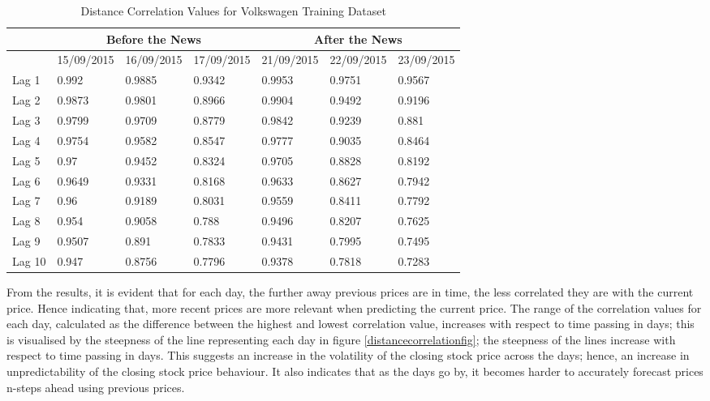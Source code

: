 \documentclass[13pt]{report}
\begin{document}
 
\begin{table}[H]
\centering
\label{distancecorrelationtab}
\begin{tabular}{|l|l|l|l|l|l|l|}
\hline
       & \multicolumn{3}{c|}{Before the News} & \multicolumn{3}{c|}{After the News}  \\ \hline
       & 15/09/2015 & 16/09/2015 & 17/09/2015 & 21/09/2015 & 22/09/2015 & 23/09/2015 \\ \hline
Lag 1  & 0.992      & 0.9885     & 0.9342     & 0.9953     & 0.9751     & 0.9567     \\ \hline
Lag 2  & 0.9873     & 0.9801     & 0.8966     & 0.9904     & 0.9492     & 0.9196     \\ \hline
Lag 3  & 0.9799     & 0.9709     & 0.8779     & 0.9842     & 0.9239     & 0.881      \\ \hline
Lag 4  & 0.9754     & 0.9582     & 0.8547     & 0.9777     & 0.9035     & 0.8464     \\ \hline
Lag 5  & 0.97       & 0.9452     & 0.8324     & 0.9705     & 0.8828     & 0.8192     \\ \hline
Lag 6  & 0.9649     & 0.9331     & 0.8168     & 0.9633     & 0.8627     & 0.7942     \\ \hline
Lag 7  & 0.96       & 0.9189     & 0.8031     & 0.9559     & 0.8411     & 0.7792     \\ \hline
Lag 8  & 0.954      & 0.9058     & 0.788      & 0.9496     & 0.8207     & 0.7625     \\ \hline
Lag 9  & 0.9507     & 0.891      & 0.7833     & 0.9431     & 0.7995     & 0.7495     \\ \hline
Lag 10 & 0.947      & 0.8756     & 0.7796     & 0.9378     & 0.7818     & 0.7283     \\ \hline
\end{tabular}
\caption{Distance Correlation Values for Volkswagen Training Dataset}
\end{table}

From the results, it is evident that for each day, the further away previous prices are in time, the less correlated they are with the current price. Hence indicating that, more recent prices are more relevant when predicting the current price. The range of the correlation values for each day, calculated as the difference between the highest and lowest correlation value, increases with respect to time passing in days; this is visualised by the steepness of the line representing each day in figure \ref{distancecorrelationfig}; the steepness of the lines increase with respect to time passing in days. This suggests an increase in the volatility of the closing stock price across the days; hence, an increase in unpredictability of the closing stock price behaviour. It also indicates that as the days go by, it becomes harder to accurately forecast prices n-steps ahead using previous prices.\par
\end{document}
